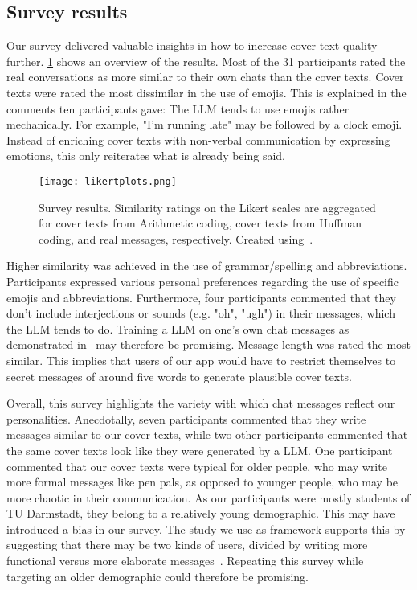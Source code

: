\subsection{Survey results}
\label{sec:surveyResults}
Our survey delivered valuable insights in how to increase cover text quality further. \cref{fig:likertplots} shows an overview of the results. Most of the 31 participants rated the real conversations as more similar to their own chats than the cover texts. Cover texts were rated the most dissimilar in the use of emojis. This is explained in the comments ten participants gave: The \gls{LLM} tends to use emojis rather mechanically. For example, "I'm running late" may be followed by a clock emoji. Instead of enriching cover texts with non-verbal communication by expressing emotions, this only reiterates what is already being said.

\begin{figure}
	\centering
	\captionsetup{width=\linewidth}
	\texttt{[image: likertplots.png]}
	\caption[Survey: Results]{Survey results. Similarity ratings on the Likert scales are aggregated for cover texts from Arithmetic coding, cover texts from Huffman coding, and real messages, respectively. Created using~\cite{maurerLikertplotcomPlotLikert2013}.}
	\label{fig:likertplots}
\end{figure}

Higher similarity was achieved in the use of grammar/spelling and abbreviations. Participants expressed various personal preferences regarding the use of specific emojis and abbreviations. Furthermore, four participants commented that they don't include interjections or sounds (e.g. "oh", "ugh") in their messages, which the \gls{LLM} tends to do. Training a \gls{LLM} on one's own chat messages as demonstrated in~\cite{donnerSimulationMeFinetuning2024} may therefore be promising. Message length was rated the most similar. This implies that users of our app would have to restrict themselves to secret messages of around five words to generate plausible cover texts.

Overall, this survey highlights the variety with which chat messages reflect our personalities. Anecdotally, seven participants commented that they write messages similar to our cover texts, while two other participants commented that the same cover texts look like they were generated by a \gls{LLM}. One participant commented that our cover texts were typical for older people, who may write more formal messages like pen pals, as opposed to younger people, who may be more chaotic in their communication. As our participants were mostly students of TU Darmstadt, they belong to a relatively young demographic. This may have introduced a bias in our survey. The study we use as framework supports this by suggesting that there may be two kinds of users, divided by writing more functional versus more elaborate messages~\cite{alazzawieLinguisticSituationalFeatures2022}. Repeating this survey while targeting an older demographic could therefore be promising.

